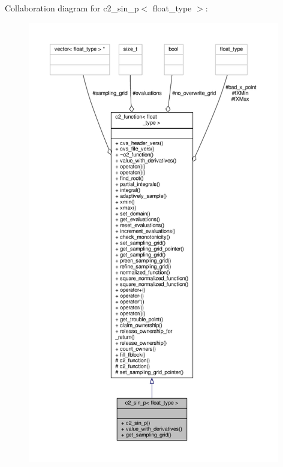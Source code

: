 Collaboration diagram for c2\+\_\+sin\+\_\+p$<$ float\+\_\+type $>$\+:
\nopagebreak
\begin{figure}[H]
\begin{center}
\leavevmode
\includegraphics[height=550pt]{classc2__sin__p__coll__graph}
\end{center}
\end{figure}
